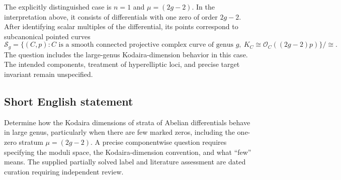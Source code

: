 \documentclass[11pt]{article}
\begin{document}
The explicitly distinguished case is \(n=1\) and \(\mu=(2g-2)\). In the interpretation above, it consists of differentials with one zero of order \(2g-2\). After identifying scalar multiples of the differential, its points correspond to subcanonical pointed curves
\[
\mathcal S_g=\{(C,p): C\text{ is a smooth connected projective complex curve of genus }g,\ K_C\cong\mathcal O_C((2g-2)p)\}/\cong.
\]
The question includes the large-genus Kodaira-dimension behavior in this case. The intended components, treatment of hyperelliptic loci, and precise target invariant remain unspecified.
\subsection{Short English statement}
Determine how the Kodaira dimensions of strata of Abelian differentials behave in large genus, particularly when there are few marked zeros, including the one-zero stratum \(\mu=(2g-2)\). A precise componentwise question requires specifying the moduli space, the Kodaira-dimension convention, and what ``few'' means. The supplied partially solved label and literature assessment are dated curation requiring independent review.
\end{document}
